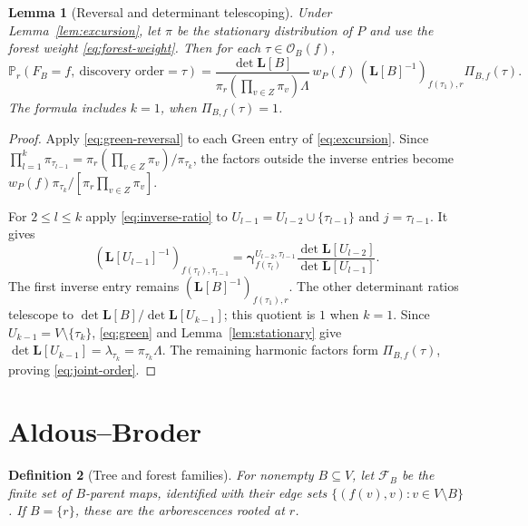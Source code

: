 \documentclass[11pt]{article}
\newtheorem{definition}{Definition}[section]
\newtheorem{lemma}[definition]{Lemma}
\newcommand{\Lmat}{\mathbf L}
\newcommand{\gam}{\boldsymbol\gamma}
\newcommand{\Ord}{\mathcal O}
\begin{document}
\begin{lemma}[Reversal and determinant telescoping]
\label{lem:joint-order}
Under Lemma~\ref{lem:excursion}, let $\pi$ be the stationary
distribution of $P$ and use the forest weight
\eqref{eq:forest-weight}.
Then for each $\tau\in\Ord_B(f)$,
\begin{equation}\label{eq:joint-order}
\mathbb P_r(F_B=f,\ \text{discovery order}=\tau)
=\frac{\det\Lmat[B]}
 {\pi_r(\prod_{v\in Z}\pi_v)\Lambda}\,
 w_P(f)\,(\Lmat[B]^{-1})_{f(\tau_1),r}
 \Pi_{B,f}(\tau).
\end{equation}
The formula includes $k=1$, when $\Pi_{B,f}(\tau)=1$.
\end{lemma}
\begin{proof}
Apply \eqref{eq:green-reversal} to each Green entry of
\eqref{eq:excursion}. Since
$\prod_{l=1}^k\pi_{\tau_{l-1}}
=\pi_r(\prod_{v\in Z}\pi_v)/\pi_{\tau_k}$, the factors
outside the inverse entries become
$w_P(f)\pi_{\tau_k}/[\pi_r\prod_{v\in Z}\pi_v]$.

For $2\leq l\leq k$ apply \eqref{eq:inverse-ratio} to
$U_{l-1}=U_{l-2}\cup\{\tau_{l-1}\}$ and
$j=\tau_{l-1}$. It gives
\[
(\Lmat[U_{l-1}]^{-1})_{f(\tau_l),\tau_{l-1}}
=\gam^{U_{l-2},\tau_{l-1}}_{f(\tau_l)}
  \frac{\det\Lmat[U_{l-2}]}{\det\Lmat[U_{l-1}]}.
\]
The first inverse entry remains
$(\Lmat[B]^{-1})_{f(\tau_1),r}$.
The other determinant ratios telescope to
$\det\Lmat[B]/\det\Lmat[U_{k-1}]$; this quotient is $1$
when $k=1$. Since
$U_{k-1}=V\setminus\{\tau_k\}$,
\eqref{eq:green} and Lemma~\ref{lem:stationary} give
$\det\Lmat[U_{k-1}]=\lambda_{\tau_k}
=\pi_{\tau_k}\Lambda$.
The remaining harmonic factors form $\Pi_{B,f}(\tau)$, proving
\eqref{eq:joint-order}.
\end{proof}

\section{Aldous--Broder}

\begin{definition}[Tree and forest families]
\label{def:families}
For nonempty $B\subseteq V$, let $\mathcal F_B$ be the finite
set of $B$-parent maps, identified with their edge sets
$\{(f(v),v):v\in V\setminus B\}$. If $B=\{r\}$,
these are the arborescences rooted at $r$.
\end{definition}
\end{document}
